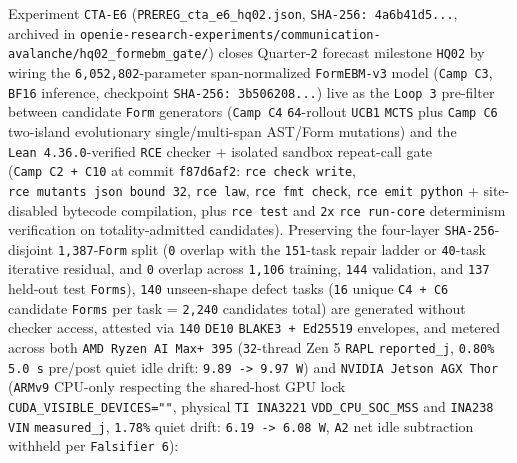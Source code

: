 \documentclass[10pt,letterpaper]{article}
\begin{document}
Experiment \texttt{CTA-E6}
(\texttt{PREREG\_\allowbreak{}cta\_\allowbreak{}e6\_\allowbreak{}hq02.\allowbreak{}json},
\texttt{SHA-\allowbreak{}256:\ 4a6b41d5...}, archived in
\texttt{openie-\allowbreak{}research-\allowbreak{}experiments/\allowbreak{}communication-\allowbreak{}avalanche/\allowbreak{}hq02\_\allowbreak{}formebm\_\allowbreak{}gate/})
closes Quarter-\texttt{2} forecast milestone \texttt{HQ02} by wiring the
\texttt{6,052,802}-parameter span-normalized \texttt{FormEBM-\allowbreak{}v3}
model (\texttt{Camp\ C3}, \texttt{BF16} inference, checkpoint
\texttt{SHA-\allowbreak{}256:\ 3b506208...}) live as the \texttt{Loop\ 3}
pre-filter between candidate \texttt{Form} generators (\texttt{Camp\ C4}
\texttt{64}-rollout \texttt{UCB1} \texttt{MCTS} plus \texttt{Camp\ C6}
two-island evolutionary single/multi-span AST/Form mutations) and the
\texttt{Lean\ 4.\allowbreak{}36.\allowbreak{}0}-verified \texttt{RCE} checker + isolated
sandbox repeat-call gate (\texttt{Camp\ C2\ +\ C10} at commit
\texttt{f87d6af2}: \texttt{rce\ check\ write},
\texttt{rce\ mutants\ json\ bound\ 32}, \texttt{rce\ law},
\texttt{rce\ fmt\ check}, \texttt{rce\ emit\ python} + site-disabled
bytecode compilation, plus \texttt{rce\ test} and \texttt{2x}
\texttt{rce\ run-core} determinism verification on totality-admitted
candidates). Preserving the four-layer \texttt{SHA-256}-disjoint
\texttt{1,387}-\texttt{Form} split (\texttt{0} overlap with the
\texttt{151}-task repair ladder or \texttt{40}-task iterative residual,
and \texttt{0} overlap across \texttt{1,106} training, \texttt{144}
validation, and \texttt{137} held-out test \texttt{Forms}), \texttt{140}
unseen-shape defect tasks (\texttt{16} unique \texttt{C4\ +\ C6}
candidate \texttt{Forms} per task = \texttt{2,240} candidates total) are
generated without checker access, attested via \texttt{140}
\texttt{DE10} \texttt{BLAKE3\ +\ Ed25519} envelopes, and metered across
both \texttt{AMD\ Ryzen\ AI\ Max+\ 395} (\texttt{32}-thread Zen 5
\texttt{RAPL} \texttt{reported\_\allowbreak{}j}, \texttt{0.80\%}
\texttt{5.0\ s} pre/post quiet idle drift:
\texttt{9.89\ -\textgreater{}\ 9.97\ W}) and
\texttt{NVIDIA\ Jetson\ AGX\ Thor} (\texttt{ARMv9} CPU-only respecting
the shared-host GPU lock \texttt{CUDA\_\allowbreak{}VISIBLE\_\allowbreak{}DEVICES=""},
physical \texttt{TI\ INA3221}
\texttt{VDD\_\allowbreak{}CPU\_\allowbreak{}SOC\_\allowbreak{}MSS} and \texttt{INA238}
\texttt{VIN} \texttt{measured\_\allowbreak{}j}, \texttt{1.78\%} quiet drift:
\texttt{6.19\ -\textgreater{}\ 6.08\ W}, \texttt{A2} net idle subtraction
withheld per \texttt{Falsifier\ 6}):
\end{document}
